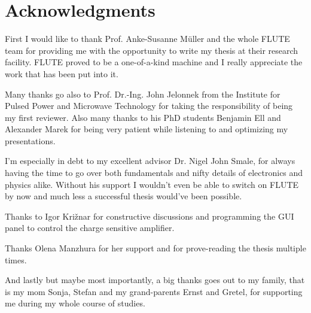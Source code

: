 \chapter*{Acknowledgments}

First I would like to thank Prof. Anke-Susanne Müller and the whole FLUTE team for providing me with the opportunity to write my thesis at their research facility. FLUTE proved to be a one-of-a-kind machine and I really appreciate the work that has been put into it.

Many thanks go also to Prof. Dr.-Ing. John Jelonnek from the Institute for Pulsed Power and Microwave Technology for taking the responsibility of being my first reviewer. Also many thanks to his PhD students Benjamin Ell and Alexander Marek for being very patient while listening to and optimizing my presentations. 

I'm especially in debt to my excellent advisor Dr. Nigel John Smale, for always having the time to go over both fundamentals and nifty details of electronics and physics alike. Without his support I wouldn't even be able to switch on FLUTE by now and much less a successful thesis would've been possible.

Thanks to Igor Križnar for constructive discussions and programming the GUI panel to control the charge sensitive amplifier.

Thanks Olena Manzhura for her support and for prove-reading the thesis multiple times.

And lastly but maybe most importantly, a big thanks goes out to my family, that is my mom Sonja, Stefan and my grand-parents Ernst and Gretel, for supporting me during my whole course of studies.
